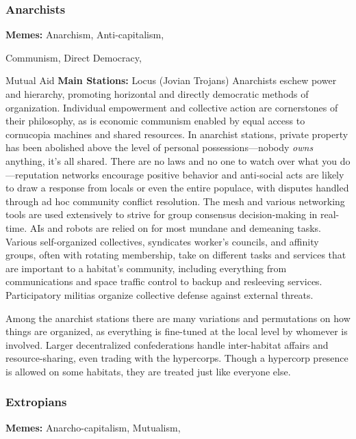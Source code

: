 \subsubsection{Anarchists}

\textbf{Memes:} Anarchism, Anti-capitalism, 

Communism, Direct Democracy, 

Mutual Aid
\textbf{Main Stations:} Locus (Jovian Trojans)
Anarchists eschew power and hierarchy, 
promoting horizontal and directly democratic
methods of organization. Individual
empowerment and collective action are 
cornerstones of their philosophy, as is 
economic communism enabled by equal 
access to cornucopia machines and shared 
resources. In anarchist stations, private 
property has been abolished above the 
level of personal possessions—nobody 
\textit{owns} anything, it's all shared. There are 
no laws and no one to watch over what 
you do—reputation networks encourage 
positive behavior and anti-social acts are likely 
to draw a response from locals or even the entire 
populace, with disputes handled through ad hoc 
community conflict resolution. The mesh and various 
networking tools are used extensively to strive for 
group consensus decision-making in real-time. AIs 
and robots are relied on for most mundane and demeaning
tasks. Various self-organized collectives, syndicates
worker's councils, and affinity groups, often
with rotating membership, take on different tasks and 
services that are important to a habitat's community, 
including everything from communications and space 
traffic control to backup and resleeving services. Participatory
militias organize collective defense against
external threats.

Among the anarchist stations there are many variations
and permutations on how things are organized,
as everything is fine-tuned at the local level by whomever
is involved. Larger decentralized confederations
handle inter-habitat affairs and resource-sharing, even 
trading with the hypercorps. Though a hypercorp 
presence is allowed on some habitats, they are treated 
just like everyone else.

\subsubsection{Extropians}

\textbf{Memes:} Anarcho-capitalism, Mutualism, 

